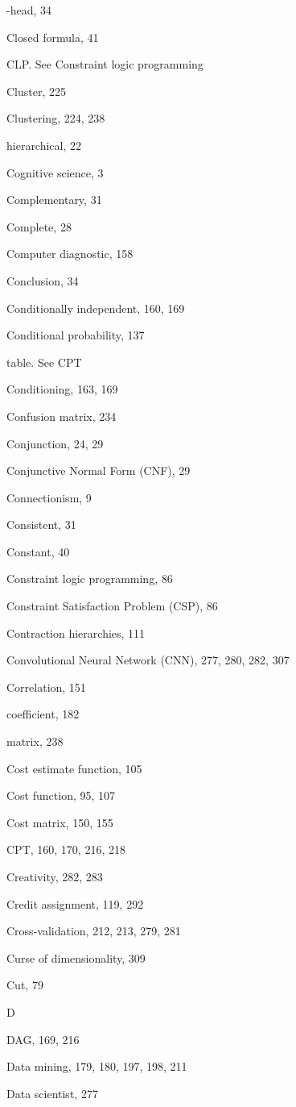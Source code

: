 \documentclass[10pt]{book}
\begin{document}
-head, 34

Closed formula, 41

CLP. See Constraint logic programming

Cluster, 225

Clustering, 224, 238

hierarchical, 22

Cognitive science, 3

Complementary, 31

Complete, 28

Computer diagnostic, 158

Conclusion, 34

Conditionally independent, 160, 169

Conditional probability, 137

table. See CPT

Conditioning, 163, 169

Confusion matrix, 234

Conjunction, 24, 29

Conjunctive Normal Form (CNF), 29

Connectionism, 9

Consistent, 31

Constant, 40

Constraint logic programming, 86

Constraint Satisfaction Problem (CSP), 86

Contraction hierarchies, 111

Convolutional Neural Network (CNN), 277, 280, 282, 307

Correlation, 151

coefficient, 182

matrix, 238

Cost estimate function, 105

Cost function, 95, 107

Cost matrix, 150, 155

CPT, 160, 170, 216, 218

Creativity, 282, 283

Credit assignment, 119, 292

Cross-validation, 212, 213, 279, 281

Curse of dimensionality, 309

Cut, 79

D

DAG, 169, 216

Data mining, 179, 180, 197, 198, 211

Data scientist, 277
\end{document}

